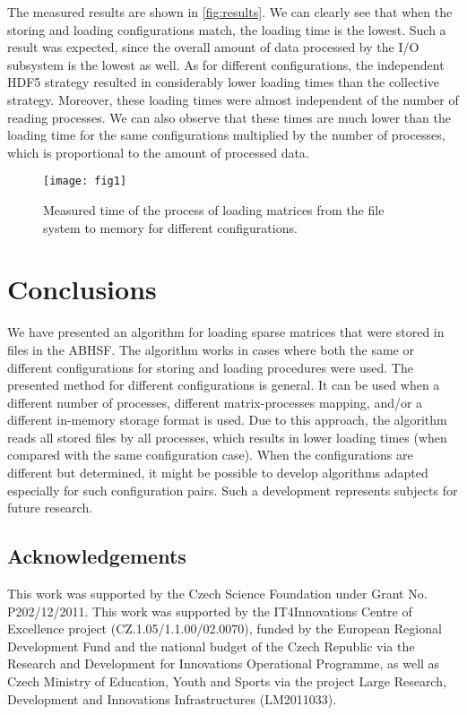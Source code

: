 \documentclass[10pt,a4paper]{article}
\begin{document}
The measured results are shown in \autoref{fig:results}. We can clearly see that when the storing and loading configurations match, the loading time is the lowest. Such a result was expected, since the overall amount of data processed by the I/O subsystem is the lowest as well. As for different configurations, the independent HDF5 strategy resulted in considerably lower loading times than the collective strategy. Moreover, these loading times were almost independent of the number of reading processes. We can also observe that these times are much lower than the loading time for the same configurations multiplied by the number of processes, which is proportional to the amount of processed data.

\begin{figure}[t]
\centering
\texttt{[image: fig1]}
\caption{Measured time of the process of loading matrices from the file system to memory for different configurations.}
\label{fig:results}
\end{figure}

\section{Conclusions}

We have presented an algorithm for loading sparse matrices that were stored in files in the ABHSF. The algorithm works in cases where both the same or different configurations for storing and loading procedures were used. The presented method for different configurations is general. It can be used when a different number of processes, different matrix-processes mapping, and/or a different in-memory storage format is used. Due to this approach, the algorithm reads all stored files by all processes, which results in lower loading times (when compared with the same configuration case). When the configurations are different but determined, it might be possible to develop algorithms adapted especially for such configuration pairs. Such a development represents subjects for future research.

\subsection*{Acknowledgements}

This work was supported by the Czech Science Foundation under Grant No. P202/12/2011.
This work was supported by the IT4Innovations Centre of Excellence project (CZ.1.05/1.1.00/02.0070), funded by the European Regional Development Fund and the national budget of the Czech Republic via the Research and Development for Innovations Operational Programme, as well as Czech Ministry of Education, Youth and Sports via the project Large Research, Development and Innovations Infrastructures (LM2011033).



\end{document}
